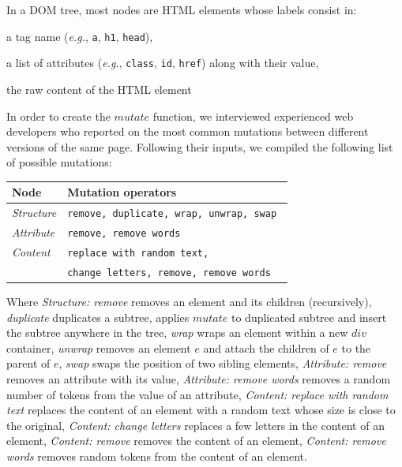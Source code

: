 \documentclass{vldb}
\begin{document}
In a DOM tree, most nodes are HTML elements whose labels consist in:
\begin{inparaenum}
    \item a tag name (\emph{e.g.}, \texttt{a}, \texttt{h1}, \texttt{head}),
    \item a list of attributes (\emph{e.g.}, \texttt{class}, \texttt{id}, \texttt{href}) along with their value,
    \item the raw content of the HTML element 
\end{inparaenum}

In order to create the $mutate$ function, we interviewed experienced web developers who reported on the most common mutations between different versions of the same page.
Following their inputs, we compiled the following list of possible mutations:
\begin{center}
  \begin{tabular}{|l l|} 
      \hline
      Node          & Mutation operators\\
      \hline
      \hline
      \em Structure & \tt remove, duplicate, wrap, unwrap, swap \\
      \em Attribute & \tt remove, remove words \\
      \em Content   & \tt replace with random text, \\
                    & \tt change letters, remove, remove words \\
      \hline
  \end{tabular}
\end{center}

Where
\textit{Structure: remove} removes an element and its children (recursively), 
\textit{duplicate} duplicates a subtree, applies $mutate$ to duplicated subtree and insert the subtree anywhere in the tree,
\textit{wrap} wraps an element within a new $div$ container,
\textit{unwrap} removes an element $e$ and attach the children of $e$ to the parent of $e$,
\textit{swap} swaps the position of two sibling elements,
\textit{Attribute: remove} removes an attribute with its value,
\textit{Attribute: remove words} removes a random number of tokens from the value of an attribute,
\textit{Content: replace with random text} replaces the content of an element with a random text whose size is close to the original,
\textit{Content: change letters} replaces a few letters in the content of an element,
\textit{Content: remove} removes the content of an element,
\textit{Content: remove words} removes random tokens from the content of an element.
\end{document}
